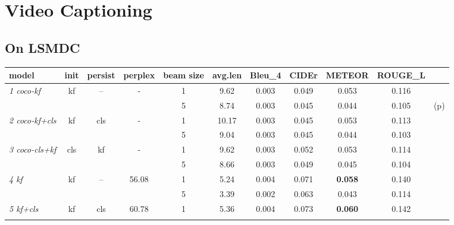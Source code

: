 \section{Video Captioning}
\subsection{On LSMDC}

\begin{table}[t]
  \newcommand{\modpar}[4]{%
    \multirow{2}{*}{\emph{#1}} & \multirow{2}{*}{#2} & \multirow{2}{*}{#3}
    & \multirow{2}{*}{#4}}
\centering
    \begin{tabular}{|l|c|c|c|c|c|c|c|c|c|c|}
        \hline\hline
        \bf model    &\bf init &\bf persist &\bf perplex &\bf beam size &\bf avg.len &\bf Bleu\_4 &\bf CIDEr &\bf METEOR &\bf ROUGE\_L    & \\\hline\hline
        \modpar{1 coco-kf}{kf}{--}{ - }      & 1 & 9.62  &   0.003 &   0.049 &   0.053 &   0.116 &     \\\cline{5-11}
                                       & & & & 5 & 8.74  &   0.003 &   0.045 &   0.044 &   0.105 & (p) \\\hline
        \modpar{2 coco-kf+cls}{kf}{cls}{ - } & 1 & 10.17 &   0.003 &   0.045 &   0.053 &   0.113 &     \\\cline{5-11}
                                       & & & & 5 & 9.04  &   0.003 &   0.045 &   0.044 &   0.103 &     \\\hline
        \modpar{3 coco-cls+kf}{cls}{kf}{ - } & 1 & 9.62  &   0.003 &   0.052 &   0.053 &   0.114 &     \\\cline{5-11}
                                       & & & & 5 & 8.66  &   0.003 &   0.049 &   0.045 &   0.104 &     \\\hline\hline
        \modpar{4 kf}{kf}{--}{56.08}         & 1 & 5.24  &   0.004 &   0.071 &\bf0.058 &   0.140 &     \\\cline{5-11}
                                       & & & & 5 & 3.39  &   0.002 &   0.063 &   0.043 &   0.114 &     \\\hline
        \modpar{5 kf+cls}{kf}{cls}{60.78}    & 1 & 5.36  &   0.004 &   0.073 &\bf0.060 &   0.142 &     \\\cline{5-11}

\end{tabular}
\end{table}
